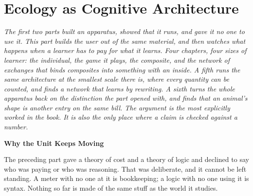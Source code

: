 \documentclass[12pt,openright,twoside]{book}
\theoremstyle{remark}
\theoremstyle{plain}
\theoremstyle{remark}
\theoremstyle{plain}
\theoremstyle{plain}
\begin{document}
\bigskip


\part{Ecology as Cognitive Architecture}
\label{part:ecology}

\vspace{1em}
\begin{mdframed}[backgroundcolor=remarkgray, linecolor=gray!60,
                 linewidth=1pt, topline=false, rightline=false,
                 bottomline=false]
\small\itshape
The first two parts built an apparatus, showed that it runs, and gave it
no one to use it.
This part builds the user out of the same material, and then watches what
happens when a learner has to pay for what it learns.
Four chapters, four sizes of learner: the individual, the game it plays,
the composite, and the network of exchanges that binds composites into
something with an inside.
A fifth runs the same architecture at the smallest scale there is, where
every quantity can be counted, and finds a network that learns by
rewriting.
A sixth turns the whole apparatus back on the distinction the part opened
with, and finds that an animal's shape is another entry on the same bill.
The argument is the most explicitly worked in the book.
It is also the only place where a claim is checked against a number.
\end{mdframed}

\bigskip

{}
{\large\bfseries\color{accentblue} Why the Unit Keeps Moving}
\vspace{0.8em}

\noindent
The preceding part gave a theory of cost and a theory of logic and
declined to say who was paying or who was reasoning.
That was deliberate, and it cannot be left standing.
A meter with no one at it is bookkeeping; a logic with no one using it is
syntax.
Nothing so far is made of the same stuff as the world it studies.
\end{document}
